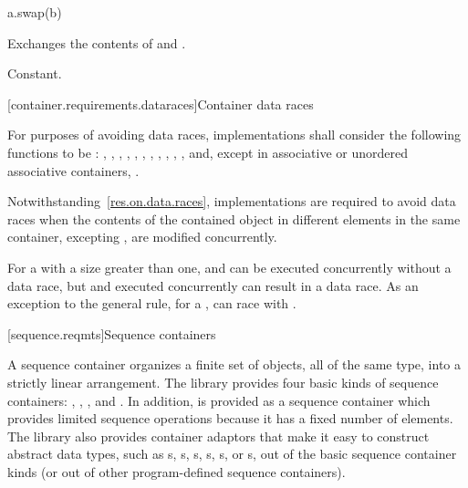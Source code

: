 %
\begin{itemdecl}
a.swap(b)
\end{itemdecl}

\begin{itemdescr}
\pnum
\result
{}

\pnum
\effects
Exchanges the contents of  and .

\pnum
\complexity
Constant.
\end{itemdescr}


[container.requirements.dataraces]{Container data races}

\pnum
For purposes of avoiding data races, implementations shall
consider the following functions to be : , ,
, , , , , ,
, , ,  and, except in
associative or unordered associative containers, .

\pnum
Notwithstanding~\ref{res.on.data.races}, implementations are required to avoid data
races when the contents of the contained object in different elements in the same
container, excepting , are modified concurrently.

\pnum
\begin{note}
For a  with a size greater than one, 
and  can be executed concurrently without a data race, but
 and  executed concurrently can result in a data
race.
As an exception to the general rule, for a , 
can race with .
\end{note}

[sequence.reqmts]{Sequence containers}

\pnum
A sequence container organizes a finite set of objects, all of the same type, into a strictly
linear arrangement. The library provides four basic kinds of sequence containers:
, , , and . In addition,
 is provided as a sequence container which provides limited sequence operations
because it has a fixed number of elements. The library also provides container adaptors that
make it easy to construct abstract data types,
such as s,
s,
s,
s,
s, or
s, out of
the basic sequence container kinds (or out of other program-defined sequence containers).

